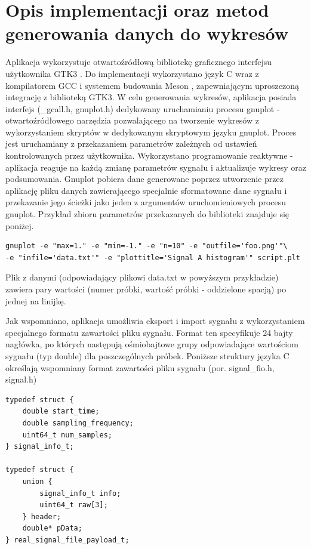 \documentclass{article}
\begin{document}
\section{Opis implementacji oraz metod generowania danych do wykresów}
Aplikacja wykorzystuje otwartoźródłową bibliotekę graficznego interfejsu użytkownika GTK3 \cite{gtk3_link}.
Do implementacji wykorzystano język C wraz z kompilatorem GCC \cite{gcc_link} i systemem budowania Meson \cite{meson_link}, zapewniającym uproszczoną integrację z biblioteką GTK3.
W celu generowania wykresów, aplikacja posiada interfejs (\_gcall.h, gnuplot.h) dedykowany uruchamianiu procesu gnuplot - otwartoźródłowego narzędzia \cite{gnuplot_link} pozwalającego na tworzenie wykresów z wykorzystaniem skryptów w dedykowanym skryptowym języku gnuplot. Proces jest uruchamiany z przekazaniem parametrów zależnych od ustawień kontrolowanych przez użytkownika. Wykorzystano programowanie reaktywne - aplikacja reaguje na każdą zmianę parametrów sygnału i aktualizuje wykresy oraz podsumowania. Gnuplot pobiera dane generowane poprzez utworzenie przez aplikację pliku danych zawierającego specjalnie sformatowane dane sygnału i przekazanie jego ścieżki jako jeden z argumentów uruchomieniowych procesu gnuplot.
Przykład zbioru parametrów przekazanych do biblioteki znajduje się poniżej.
\begin{verbatim}
gnuplot -e "max=1." -e "min=-1." -e "n=10" -e "outfile='foo.png'"\ 
-e "infile='data.txt'" -e "plottitle='Signal A histogram'" script.plt
\end{verbatim}

Plik z danymi (odpowiadający plikowi data.txt w powyższym przykładzie) zawiera pary wartości (numer próbki, wartość próbki - oddzielone spacją) po jednej na linijkę.

Jak wspomniano, aplikacja umożliwia eksport i import sygnału z wykorzystaniem  specjalnego formatu zawartości pliku sygnału.
Format ten specyfikuje 24 bajty nagłówka, po których następują ośmiobajtowe  grupy odpowiadające wartościom sygnału (typ double) dla poszczególnych próbek.
Poniższe struktury języka C określają wspomniany format zawartości pliku sygnału (por. signal\_fio.h, signal.h)
\begin{verbatim}
typedef struct {
    double start_time;
    double sampling_frequency;
    uint64_t num_samples;
} signal_info_t;

typedef struct {
    union {
        signal_info_t info;
        uint64_t raw[3];
    } header;
    double* pData;
} real_signal_file_payload_t;
\end{verbatim}
\end{document}
